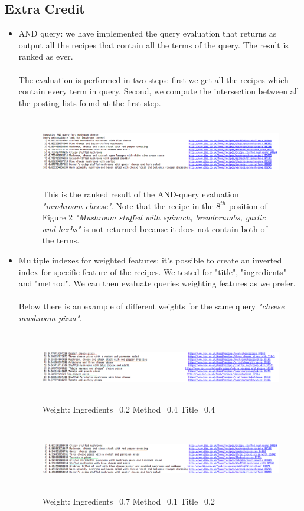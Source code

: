 \documentclass[oneside]{article}			%
\begin{document}
	\subsection{Extra Credit}
	\begin{itemize}
		\item AND query: we have implemented the query evaluation that returns as output all the recipes that contain all the terms of the query. The result is ranked as ever.
		\\\\
		The evaluation is performed in two steps: first we get all the recipes which contain every term in query. Second, we compute the intersection between all the posting lists found at the first step.
		\begin{figure}[h]
			\includegraphics[width=18cm, height=3.1cm]{./report_file/img/4_4_1_ex.png}\caption{This is the ranked result of the AND-query evaluation \textit{"mushroom cheese"}. Note that the recipe in the $8^{th}$ position of Figure 2 \textit{"Mushroom stuffed with spinach, breadcrumbs, garlic and herbs"} is not returned because it does not contain both of the terms.}
		\end{figure}
		\item Multiple indexes for weighted features: it's possible to create an inverted index for specific feature of the recipes. We tested for "title", "ingredients" and "method". We can then evaluate queries weighting features as we prefer.
		\\\\
		Below there is an example of different weights for the same query \textit{"cheese mushroom pizza"}.
		\begin{figure}[h]
			\includegraphics[width=18cm, height=3.1cm]{./report_file/img/4_4_2_ex.png}\caption{Weight: Ingredients=0.2 Method=0.4 Title=0.4}
		\end{figure}
				\begin{figure}[h]
			\includegraphics[width=18cm, height=3.1cm]{./report_file/img/4_4_3_ex.png}\caption{Weight: Ingredients=0.7 Method=0.1 Title=0.2}
		\end{figure}
	\end{itemize}
\end{document}
